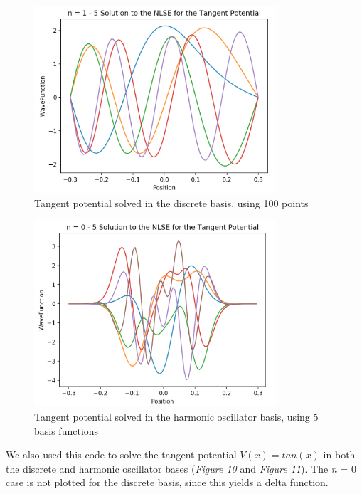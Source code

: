 \documentclass[%
 reprint,
 amsmath,amssymb,
 aps,
]{revtex4-1}
\begin{document}
\begin{figure}
\includegraphics[width=9cm]{DiscreteBasisTangent}
\caption{Tangent potential solved in the discrete basis, using 100 points}
\end{figure}
\begin{figure}
\includegraphics[width=9cm]{HOBasisTangent}
\caption{Tangent potential solved in the harmonic oscillator basis, using 5 basis functions}
\end{figure}

\noindent We also used this code to solve the tangent potential $V(x) = tan(x)$ in both the discrete and harmonic oscillator bases (\textit{Figure 10} and \textit{Figure 11}).  The \textit{n} = 0 case is not plotted for the discrete basis, since this yields a delta function.\\
\end{document}
